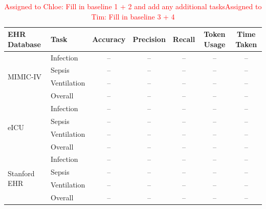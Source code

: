 \begin{table}[h]
\centering
\begin{tabular}{llccccc}
\toprule
EHR Database & Task & Accuracy & Precision & Recall & Token Usage & Time Taken \\
\midrule

\multirow{4}{*}{MIMIC-IV}
 & Infection & -- & -- & -- & -- & -- \\
 & Sepsis & -- & -- & -- & -- & -- \\
 & Ventilation & -- & -- & -- & -- & -- \\
 & Overall & -- & -- & -- & -- & -- \\
\midrule

\multirow{4}{*}{eICU}
 & Infection & -- & -- & -- & -- & -- \\
 & Sepsis & -- & -- & -- & -- & -- \\
 & Ventilation & -- & -- & -- & -- & -- \\
 & Overall & -- & -- & -- & -- & -- \\
\midrule

\multirow{4}{*}{Stanford EHR}
 & Infection & -- & -- & -- & -- & -- \\
 & Sepsis & -- & -- & -- & -- & -- \\
 & Ventilation & -- & -- & -- & -- & -- \\
 & Overall & -- & -- & -- & -- & -- \\
\bottomrule
\end{tabular}
\caption{\textcolor{red}{Assigned to Chloe: Fill in baseline 1 + 2 and add any additional tasks}\textcolor{red}{Assigned to Tim: Fill in baseline 3 + 4}}
\label{tab:database_generalization}
\end{table}
